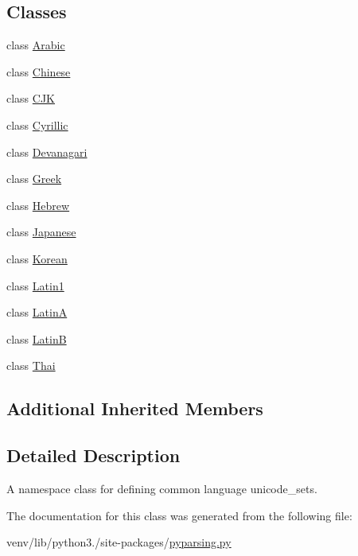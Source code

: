 \subsection*{Classes}
\begin{DoxyCompactItemize}
\item 
class \hyperlink{classpyparsing_1_1pyparsing__unicode_1_1Arabic}{Arabic}
\item 
class \hyperlink{classpyparsing_1_1pyparsing__unicode_1_1Chinese}{Chinese}
\item 
class \hyperlink{classpyparsing_1_1pyparsing__unicode_1_1CJK}{C\+JK}
\item 
class \hyperlink{classpyparsing_1_1pyparsing__unicode_1_1Cyrillic}{Cyrillic}
\item 
class \hyperlink{classpyparsing_1_1pyparsing__unicode_1_1Devanagari}{Devanagari}
\item 
class \hyperlink{classpyparsing_1_1pyparsing__unicode_1_1Greek}{Greek}
\item 
class \hyperlink{classpyparsing_1_1pyparsing__unicode_1_1Hebrew}{Hebrew}
\item 
class \hyperlink{classpyparsing_1_1pyparsing__unicode_1_1Japanese}{Japanese}
\item 
class \hyperlink{classpyparsing_1_1pyparsing__unicode_1_1Korean}{Korean}
\item 
class \hyperlink{classpyparsing_1_1pyparsing__unicode_1_1Latin1}{Latin1}
\item 
class \hyperlink{classpyparsing_1_1pyparsing__unicode_1_1LatinA}{LatinA}
\item 
class \hyperlink{classpyparsing_1_1pyparsing__unicode_1_1LatinB}{LatinB}
\item 
class \hyperlink{classpyparsing_1_1pyparsing__unicode_1_1Thai}{Thai}
\end{DoxyCompactItemize}
\subsection*{Additional Inherited Members}


\subsection{Detailed Description}
\begin{DoxyVerb}A namespace class for defining common language unicode_sets.
\end{DoxyVerb}
 

The documentation for this class was generated from the following file\+:\begin{DoxyCompactItemize}
\item 
venv/lib/python3./site-\/packages/\hyperlink{pyparsing_8py}{pyparsing.\+py}\end{DoxyCompactItemize}
